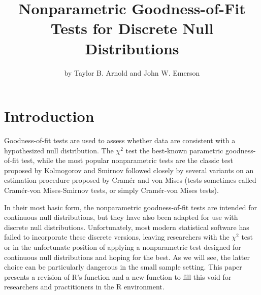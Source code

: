 \title{Nonparametric Goodness-of-Fit Tests for Discrete Null Distributions}
\author{by Taylor B. Arnold and John W. Emerson}

\maketitle




\section{Introduction}

Goodness-of-fit tests are used to assess whether data are consistent
with a hypothesized null distribution.  The $\chi^2$ test the best-known
parametric goodness-of-fit test, while the most popular nonparametric tests
are the classic test proposed by Kolmogorov and Smirnov followed closely by
several variants on an estimation procedure proposed by
Cram\'{e}r and von Mises (tests sometimes called Cram\'{e}r-von Mises-Smirnov
tests, or simply Cram\'{e}r-von Mises tests).

In their most basic form, the nonparametric goodness-of-fit
tests are intended for continuous null distributions, but they have
also been adapted for use with discrete null distributions.  Unfortunately,
most modern statistical software has failed to incorporate these discrete
versions, leaving researchers with the $\chi^2$ test or in the unfortunate
position of applying a nonparametric test designed for continuous null
distributions and hoping for the best.
As we will see, the latter choice can be particularly dangerous
in the small sample setting. This paper presents a revision of R's
 function and a new  function to
fill this void for researchers and practitioners in the R environment. 

